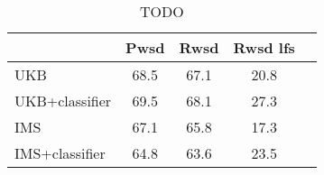 \begin{table}[!h]\begin{tabular}{l c c c c}
\toprule
                &   \textbf{Pwsd} &   \textbf{Rwsd} &   \textbf{Rwsd lfs} \\
\midrule
 UKB            &            68.5 &            67.1 &                20.8 \\
 UKB+classifier &            69.5 &            68.1 &                27.3 \\
 IMS            &            67.1 &            65.8 &                17.3 \\
 IMS+classifier &            64.8 &            63.6 &                23.5 \\
\bottomrule
\end{tabular}
\caption{TODO}
\end{table}
